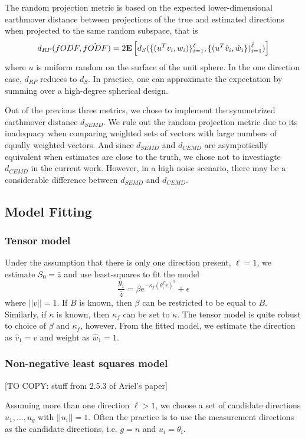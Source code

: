 \documentclass[11pt]{article}
\begin{document}
The random projection metric is based on the expected
lower-dimensional earthmover distance between projections of
the true and estimated directions when projected to the same random
subspace,
that is
\[
d_{RP}(fODF,\hat{fODF}) = 2\textbf{E}\left[d_S(\{(u^Tv_i,w_i)\}_{i=1}^\ell,\{(u^T\hat{v}_i,\hat{w}_i\})_{i=1}^{\hat{\ell}})\right]
\]
where $u$ is uniform random on the surface of the unit sphere.
In the one direction case, $d_{RP}$ reduces to $d_S$.
In practice, one can approximate the expectation by summing over a
high-degree spherical design\cite{Hardin1996}.

Out of the previous three metrics, we chose to implement the
symmetrized earthmover distance $d_{SEMD}$.
We rule out the random projection metric due to its inadequacy when
comparing weighted sets of vectors with large numbers of equally
weighted vectors.
And since $d_{SEMD}$ and $d_{CEMD}$ are asympotically equivalent when
estimates are close to the truth, we chose not to investiagte
$d_{CEMD}$ in the current work.
However, in a high noise scenario, there may be a considerable
difference between $d_{SEMD}$ and $d_{CEMD}$.


\subsection{Model Fitting}

\subsubsection{Tensor model}
Under the assumption that there is only one
direction present, $\ell=1$, we estimate $S_0 = \bar{z}$ and 
use least-squares to fit the model
\[
\frac{y_i}{\bar{z}} = \beta e^{-\kappa_f  (\theta_i^T v)^2} + \epsilon
\]
where $||v||=1$.
If $B$ is known, then $\beta$ can be restricted to be equal to $B$.
Similarly, if $\kappa$ is known, then  $\kappa_f$ can be set to
$\kappa$.
The tensor model is quite robust to choice of $\beta$ and $\kappa_f$, however.
From the fitted model, we estimate the direction as $\hat{v}_1 = v$ and
weight as $\hat{w}_1=1$.

\subsubsection{Non-negative least squares model}
[TO COPY: stuff from 2.5.3 of Ariel's paper]

Assuming more than one direction $\ell > 1$,
we choose a set of candidate directions $u_1,\hdots,u_g$ with $||u_i||=1$.
Often the practice is to use the measurement directions as the
candidate directions, i.e. $g=n$ and $u_i = \theta_i$.
\end{document}
